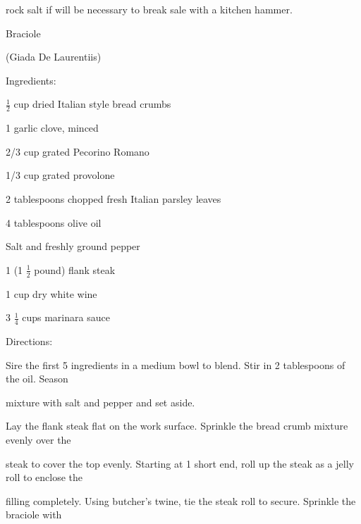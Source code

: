 \documentclass[a4paper,portrait,12pt]{book}
\begin{document}
rock salt if will be necessary to break sale with a kitchen hammer.







\newpage
Braciole




(Giada De Laurentiis)




Ingredients:




$\frac{1}{2}$ cup dried Italian style bread crumbs




1 garlic clove, minced




2/3 cup grated Pecorino Romano




1/3 cup grated provolone




2 tablespoons chopped fresh Italian parsley leaves




4 tablespoons olive oil




Salt and freshly ground pepper




1 (1 $\frac{1}{2}$ pound) flank steak




1 cup dry white wine




3 $\frac{1}{4}$ cups marinara sauce




Directions:




Sire the first 5 ingredients in a medium bowl to blend. Stir in 2 tablespoons of the oil. Season




mixture with salt and pepper and set aside.




Lay the flank steak flat on the work surface. Sprinkle the bread crumb mixture evenly over the




steak to cover the top evenly. Starting at 1 short end, roll up the steak as a jelly roll to enclose the




filling completely. Using butcher's twine, tie the steak roll to secure. Sprinkle the braciole with
\end{document}

